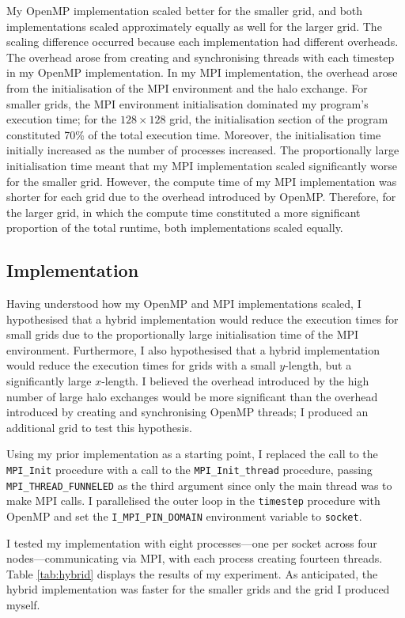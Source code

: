 \documentclass[twocolumn, a4paper]{article}
\begin{document}
My OpenMP implementation scaled better for the smaller grid, and both implementations scaled approximately equally as well for the larger grid.
The scaling difference occurred because each implementation had different overheads.
The overhead arose from creating and synchronising threads with each timestep in my OpenMP implementation.
In my MPI implementation, the overhead arose from the initialisation of the MPI environment and the halo exchange.
For smaller grids, the MPI environment initialisation dominated my program's execution time; for the $128 \times 128$ grid, the initialisation section of the program constituted 70\% of the total execution time.
Moreover, the initialisation time initially increased as the number of processes increased.
The proportionally large initialisation time meant that my MPI implementation scaled significantly worse for the smaller grid.
However, the compute time of my MPI implementation was shorter for each grid due to the overhead introduced by OpenMP.
Therefore, for the larger grid, in which the compute time constituted a more significant proportion of the total runtime, both implementations scaled equally.

\subsection{Implementation}

Having understood how my OpenMP and MPI implementations scaled, I hypothesised that a hybrid implementation would reduce the execution times for small grids due to the proportionally large initialisation time of the MPI environment.
Furthermore, I also hypothesised that a hybrid implementation would reduce the execution times for grids with a small $y$-length, but a significantly large $x$-length.
I believed the overhead introduced by the high number of large halo exchanges would be more significant than the overhead introduced by creating and synchronising OpenMP threads; I produced an additional grid to test this hypothesis.

Using my prior implementation as a starting point, I replaced the call to the \texttt{MPI\_Init} procedure with a call to the \texttt{MPI\_Init\_thread} procedure, passing \texttt{MPI\_THREAD\_FUNNELED} as the third argument since only the main thread was to make MPI calls.
I parallelised the outer loop in the \texttt{timestep} procedure with OpenMP and set the \texttt{I\_MPI\_PIN\_DOMAIN} environment variable to \texttt{socket}.

I tested my implementation with eight processes---one per socket across four nodes---communicating via MPI, with each process creating fourteen threads.
Table \ref{tab:hybrid} displays the results of my experiment.
As anticipated, the hybrid implementation was faster for the smaller grids and the grid I produced myself.
\end{document}
